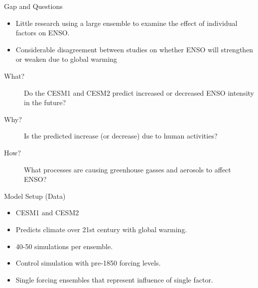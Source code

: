 \documentclass{beamer}
\begin{document}
\begin{frame}
  \begin{block}{Gap and Questions}
    \begin{itemize}
    \item Little research using a large ensemble to examine the effect of individual factors on ENSO.
    \item Considerable disagreement between studies on whether ENSO will strengthen or weaken due to global warming
    \end{itemize}
    \begin{description}
    \item[What?] Do the CESM1 and CESM2 predict increased or decreased ENSO intensity in the future?
    \item[Why?] Is the predicted increase (or decrease) due to human activities?
    \item[How?] What processes are causing greenhouse gasses and aerosols to affect ENSO?
    \end{description}
  \end{block}
  \vfill

  \begin{block}{Model Setup (Data)}
    \begin{itemize}
    \item CESM1 \citep{kay2015community} and CESM2 \citep{danabasoglu2020community}
    \item Predicts climate over 21st century with global warming.
    \item 40-50 simulations per ensemble.
    \item Control simulation with pre-1850 forcing levels.
    \item Single forcing ensembles that represent influence of single factor.
    \end{itemize}
  \end{block}
  \vfill


\end{frame}
\end{document}
